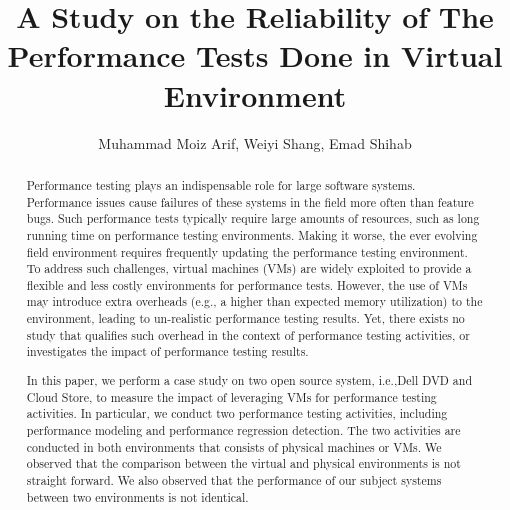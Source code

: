 \documentclass[review]{elsarticle}
\begin{document}
	
	\begin{frontmatter}
		
		\title{A Study on the Reliability of The Performance Tests Done in Virtual Environment}
		
		\author{Muhammad Moiz Arif, Weiyi Shang, Emad Shihab}%
		\address{Concordia University, Montreal, Quebec}
		
		
		
		
		\begin{abstract}
			Performance testing plays an indispensable role for large software systems. Performance issues cause failures of these systems in the field more often than feature bugs. Such performance tests typically require large amounts of resources, such as long running time on performance testing environments. Making it worse, the ever evolving field environment requires frequently updating the performance testing environment. To address such challenges, virtual machines (VMs) are widely exploited to provide a flexible and less costly environments for performance tests. However, the use of VMs may introduce extra overheads (e.g., a higher than expected memory utilization) to the environment, leading to un-realistic performance testing results. Yet, there exists no study that qualifies such overhead in the context of performance testing activities, or investigates the impact of performance testing results. 
			
			In this paper, we perform a case study on two open source system, i.e.,Dell DVD and Cloud Store, to measure the impact of leveraging VMs for performance testing activities. In particular, we conduct two performance testing activities, including performance modeling and performance regression detection. The two activities are conducted in both environments that consists of physical machines or VMs. We observed that the comparison between the virtual and physical environments is not straight forward. We also observed that the performance of our subject systems between two environments is not identical.
			

\end{abstract}
\end{frontmatter}
\end{document}
